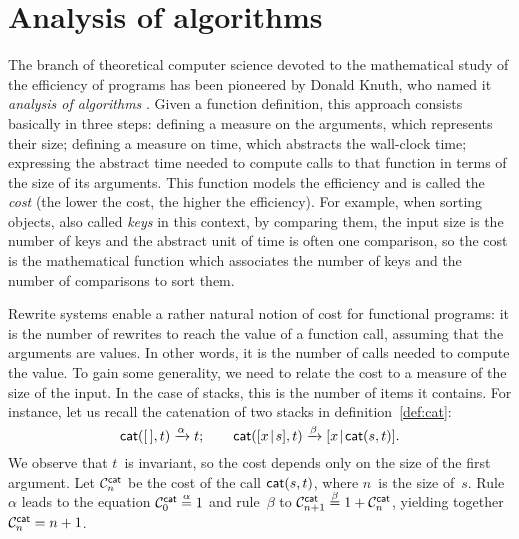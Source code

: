 \section{Analysis of algorithms}

The branch of theoretical computer science devoted to the mathematical
study of the efficiency of programs has been pioneered by Donald
Knuth, who named it \emph{analysis of algorithms}
\citep{SedgewickFlajolet_1996,Knuth_1997}. Given a function
definition, this approach consists basically in three steps: defining
a measure on the arguments, which represents their size; defining a
measure on time, which abstracts the wall\hyp{}clock time; expressing
the abstract time needed to compute calls to that function in terms of
the size of its arguments. This function models the efficiency and is
called the \emph{cost} (the lower the cost, the higher the
efficiency). For example, when sorting objects, also called
\emph{keys} in this context, by comparing
them, the input size is the number of keys and the abstract unit of
time is often one comparison, so the cost is the mathematical function
which associates the number of keys and the number of comparisons
to sort them.



Rewrite systems enable a rather natural notion of cost for functional
programs: it is the number of rewrites to reach the value of a
function call, assuming that the arguments are values. In other words,
it is the number of calls needed to compute the value. To gain some
generality, we need to relate the cost to a measure of the size of the
input. In the case of stacks, this is the number of items it
contains. For instance, let us recall the catenation of two stacks in
definition~\eqref{def:cat}:
\begin{equation*}
\fun{cat}(        \el,t) \xrightarrow{\smash{\alpha}} t;\qquad
\fun{cat}(\cons{x}{s},t) \xrightarrow{\smash{\beta}}
\cons{x}{\fun{cat}(s,t)}.
\end{equation*}
We observe that \(t\)~is invariant, so the cost depends only on the
size of the first argument. Let
\(\C{\fun{cat}}{n}\) be the cost of the
call \(\fun{cat}(s,t)\), where \(n\)~is the
size of~\(s\). Rule~\(\alpha\) leads to the equation
\(\C{\fun{cat}}{0} \eqn{\smash{\alpha}} 1\) and rule~\(\beta\) to
\(\C{\fun{cat}}{n+1} \eqn{\smash{\beta}} 1 + \C{\fun{cat}}{n}\),
yielding together \(\C{\fun{cat}}{n} = n +
1\).\label{cost:cat}


